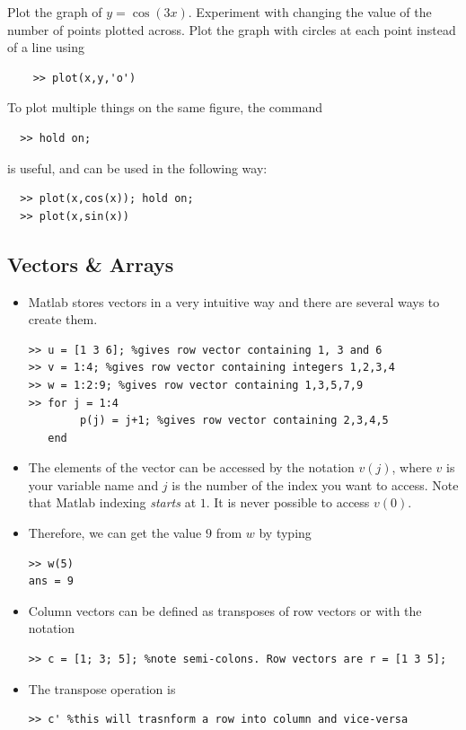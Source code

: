 \documentclass[12pt]{report}
\begin{document}
\begin{tcolorbox}[title=Task - Quick]
  Plot the graph of $y = \cos(3x)$. Experiment with changing the value of the number of points plotted across. Plot the graph with circles at each point instead of a line using
  \begin{lstlisting}
    >> plot(x,y,'o')
  \end{lstlisting}
  To plot multiple things on the same figure, the command 
  \begin{lstlisting}
  >> hold on;
  \end{lstlisting}
  is useful, and can be used in the following way:
  \begin{lstlisting}
  >> plot(x,cos(x)); hold on;
  >> plot(x,sin(x))
  \end{lstlisting}
\end{tcolorbox}

\subsection*{Vectors \& Arrays}
\begin{itemize}
\item Matlab stores vectors in a very intuitive way and there are several ways to create them.
\begin{lstlisting}
>> u = [1 3 6]; %gives row vector containing 1, 3 and 6
>> v = 1:4; %gives row vector containing integers 1,2,3,4
>> w = 1:2:9; %gives row vector containing 1,3,5,7,9
>> for j = 1:4
		p(j) = j+1; %gives row vector containing 2,3,4,5
   end
\end{lstlisting}
\item The elements of the vector can be accessed by the notation $v(j)$, where $v$ is your variable name and $j$ is the number of the index you want to access. Note that Matlab indexing \textit{starts} at $1$. It is never possible to access $v(0)$.
\item Therefore, we can get the value $9$ from $w$ by typing 
\begin{lstlisting}
>> w(5)
ans = 9
\end{lstlisting}
\item Column vectors can be defined as transposes of row vectors or with the notation
\begin{lstlisting}
>> c = [1; 3; 5]; %note semi-colons. Row vectors are r = [1 3 5];
\end{lstlisting}
\item The transpose operation is 
\begin{lstlisting}
>> c' %this will trasnform a row into column and vice-versa
\end{lstlisting}
\end{itemize}
\end{document}
